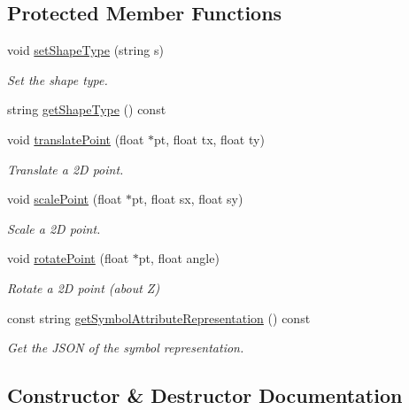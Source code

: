 \subsection*{Protected Member Functions}
\begin{DoxyCompactItemize}
\item 
void \hyperlink{classbridges_1_1datastructure_1_1_symbol_add56ff3bb5b276c016cfe377ff0f3fe2}{set\+Shape\+Type} (string s)
\begin{DoxyCompactList}\small\item\em Set the shape type. \end{DoxyCompactList}\item 
string \hyperlink{classbridges_1_1datastructure_1_1_symbol_a8f8378ed4009865611ce8b93e4432211}{get\+Shape\+Type} () const
\item 
void \hyperlink{classbridges_1_1datastructure_1_1_symbol_a3331549f82faa00d8fee5f51ca547cb0}{translate\+Point} (float $\ast$pt, float tx, float ty)
\begin{DoxyCompactList}\small\item\em Translate a 2D point. \end{DoxyCompactList}\item 
void \hyperlink{classbridges_1_1datastructure_1_1_symbol_ac27131f6461a763e55f1127f3cf87932}{scale\+Point} (float $\ast$pt, float sx, float sy)
\begin{DoxyCompactList}\small\item\em Scale a 2D point. \end{DoxyCompactList}\item 
void \hyperlink{classbridges_1_1datastructure_1_1_symbol_ad40678e04bae69b4c03881148678e71e}{rotate\+Point} (float $\ast$pt, float angle)
\begin{DoxyCompactList}\small\item\em Rotate a 2D point (about Z) \end{DoxyCompactList}\item 
const string \hyperlink{classbridges_1_1datastructure_1_1_symbol_ab9a92e73867a95e8cc3e63cad75d266a}{get\+Symbol\+Attribute\+Representation} () const
\begin{DoxyCompactList}\small\item\em Get the J\+S\+ON of the symbol representation. \end{DoxyCompactList}\end{DoxyCompactItemize}


\subsection{Constructor \& Destructor Documentation}
\mbox{\label{classbridges_1_1datastructure_1_1_symbol_a6169106c021d20752abba3cd266ecfb0}} 
